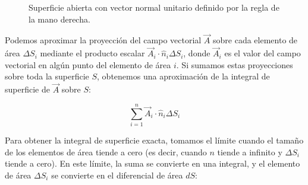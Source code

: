\documentclass{article}
\begin{document}
\begin{itemize}
\begin{figure}[h]
    \caption{Superficie abierta con vector normal unitario definido por la regla de la mano derecha.}
    \label{fig:sup_abierta}
\end{figure}
\end{itemize}

Podemos aproximar la proyección del campo vectorial $\vec{A}$ sobre cada elemento de área $\Delta S_i$ mediante el producto escalar $\vec{A}_i \cdot \hat{n}_i \Delta S_i$, donde $\vec{A}_i$ es el valor del campo vectorial en algún punto del elemento de área $i$. Si sumamos estas proyecciones sobre toda la superficie $S$, obtenemos una aproximación de la integral de superficie de $\vec{A}$ sobre $S$:

\[
\sum_{i=1}^n \vec{A}_i \cdot \hat{n}_i \Delta S_i
\]

Para obtener la integral de superficie exacta, tomamos el límite cuando el tamaño de los elementos de área tiende a cero (es decir, cuando $n$ tiende a infinito y $\Delta S_i$ tiende a cero). En este límite, la suma se convierte en una integral, y el elemento de área $\Delta S_i$ se convierte en el diferencial de área $dS$:
\end{document}
